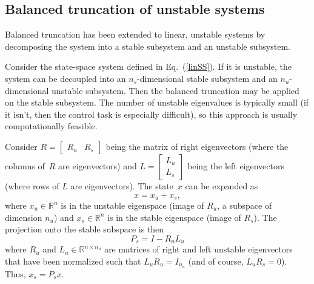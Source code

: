 \documentclass[12pt,lot, lof]{puthesis}
\newcommand{\R}{\mathbb{R}}
\begin{document}
\subsection{Balanced truncation of unstable systems}
Balanced truncation has been extended to linear, unstable systems \cite{Zhou, Ahuja} by decomposing the system into a stable subsystem and an unstable subsystem.

Consider the state-space system defined in Eq.~(\ref{linSS}). If it is unstable, the system can be decoupled into an $n_s$-dimensional stable subsystem and an $n_u$-dimensional unstable subsystem. Then the balanced truncation may be applied on the stable subsystem.  The number of unstable eigenvalues is typically small (if it isn't, then the control task is especially difficult), so this approach is usually computationally feasible.

Consider $R=
\begin{bmatrix}
  R_u & R_s
\end{bmatrix}
$ being the matrix of right eigenvectors (where the columns of~$R$ are
eigenvectors) and $L =
\begin{bmatrix}
  L_u \\ L_s
\end{bmatrix}
$
being the left eigenvectors (where rows of $L$ are eigenvectors).  The state~$x$ can be expanded as
\begin{equation}
  \label{eq:1}
  x = x_u + x_s,
\end{equation}
where $x_u\in\R^n$ is in the unstable eigenspace (image of $R_u$, a subspace of
dimension $n_u$) and
$x_s\in\R^n$ is in the stable eigenspace (image of $R_s$).  The projection onto
the stable subspace is then
\begin{equation}
 P_s = I - R_u L_u
\end{equation}
where $R_u$ and $L_u \in \mathbb{R}^{n \times n_u}$ are matrices of right and left unstable eigenvectors that have been normalized such that $L_uR_u = I_{n_u}$ (and of course, $L_uR_s = 0$). Thus,  $x_s=P_s x$.
\end{document}
